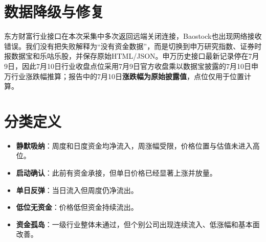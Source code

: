 \section{数据降级与修复}

东方财富行业接口在本次采集中多次返回远端关闭连接，Baostock也出现网络接收错误。我们没有把失败解释为“没有资金数据”，而是切换到申万研究指数、证券时报数据宝和乐咕乐股，并保存原始HTML/JSON。申万历史接口最新记录停在7月9日，因此7月10日行业收盘点位采用7月9日官方收盘乘以数据宝披露的7月10日申万行业涨跌幅推算；报告中的7月10日\textbf{涨跌幅为原始披露值}，点位仅用于位置计算。

\section{分类定义}

\begin{itemize}
  \item \textbf{静默吸纳}：周度和日度资金均净流入，周涨幅受限，价格位置与估值未进入高位。
  \item \textbf{启动确认}：此前有资金承接，但单日价格已经显著上涨并放量。
  \item \textbf{单日反弹}：当日流入但周度仍净流出。
  \item \textbf{低位无资金}：价格低但资金持续流出。
  \item \textbf{资金孤岛}：一级行业整体未通过，但个别公司出现连续流入、低涨幅和基本面改善。
\end{itemize}
